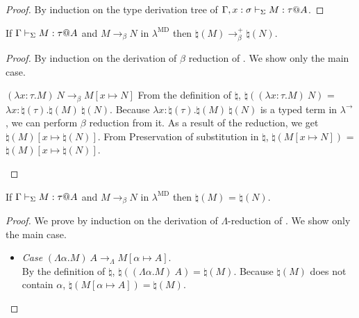 \begin{proof}
    By induction on the type derivation tree of $\G, x:\sigma \V M:\tau@A$.
\end{proof}

\begin{lemma}
    \label{lemma:PreservationOfBetaReductionInNatural}
    If $\G \V M:\tau@A$ and $M \longrightarrow_\beta N$ in $\lambda^{\text{MD}}$
    then $\natural(M) \longrightarrow_\beta^+ \natural(N)$.
\end{lemma}

\begin{proof}
    {
        By induction on the derivation of $\beta$ reduction of \LMD.
        We show only the main case.
        \newcommand{\R}{\longrightarrow_{\beta}}
        \begin{rneqncase}{$(\lambda x:\tau.M)\ N \R M[x \mapsto N]$}{}
            From the definition of $\natural$,
            $\natural((\lambda x:\tau.M)\ N)$ = $\lambda x:\natural(\tau).\natural(M)\ \natural(N)$.
            Because $\lambda x:\natural(\tau).\natural(M)\ \natural(N)$ is a typed term in $\lambda^\to$,
            we can perform $\beta$ reduction from it.
            As a result of the reduction, we get $\natural(M)[x\mapsto\natural(N)]$.
            From Preservation of substitution in $\natural$, $\natural(M[x \mapsto N])$ = $\natural(M)[x\mapsto\natural(N)]$.
        \end{rneqncase}
    }
\end{proof}

\begin{lemma}
    \label{lemma:PreservationOfLambdaReductionInNatural}
    If $\G \V M:\tau@A$ and $M \longrightarrow_\beta N$ in $\lambda^{\text{MD}}$
    then $\natural(M)$ =  $\natural(N)$.
\end{lemma}

\begin{proof}
    We prove by induction on the derivation of $\Lambda$-reduction of \LMD.
    We show only the main case.
    \begin{itemize}
        \item \textit{Case} \( (\Lambda\alpha.M)\ A \longrightarrow_\Lambda M[\alpha\mapsto A] \).\\
            By the definition of $\natural$, \(\natural((\Lambda\alpha.M)\ A) = \natural(M)\).
            Because \(\natural(M)\) does not contain \(\alpha\), \(\natural(M[\alpha\mapsto A]) = \natural(M)\).
    \end{itemize}

\end{proof}

